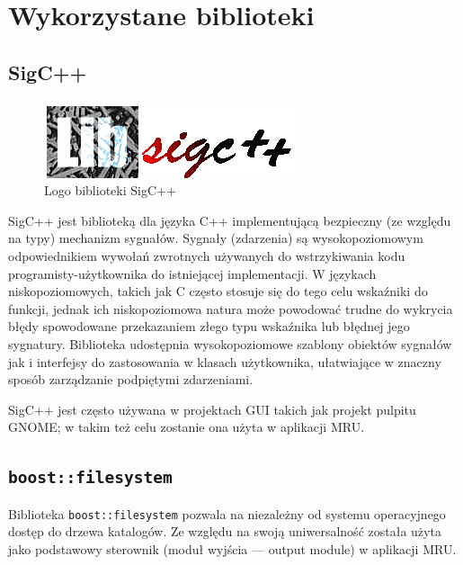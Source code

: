 
\section{Wykorzystane biblioteki}
\label{wykorzystane-biblioteki}

\subsection{SigC++}
\begin{figure}
\begin{center}
\includegraphics[scale=0.50]{img/sigcpp_logo.png}
\end{center}
\caption{Logo biblioteki SigC++}
\end{figure}
\par
SigC++ jest biblioteką dla języka C++ implementującą bezpieczny (ze względu na typy) mechanizm sygnałów.
Sygnały (zdarzenia) są wysokopoziomowym odpowiednikiem wywołań zwrotnych używanych do wstrzykiwania kodu programisty-użytkownika do istniejącej implementacji. W językach niskopoziomowych, takich jak C często stosuje się do tego celu wskaźniki do funkcji, jednak ich niskopoziomowa natura może powodować trudne do wykrycia błędy spowodowane przekazaniem złego typu wskaźnika lub błędnej jego sygnatury. Biblioteka udostępnia wysokopoziomowe szablony obiektów sygnałów jak i interfejsy do zastosowania w klasach użytkownika, ułatwiające w znaczny sposób zarządzanie podpiętymi zdarzeniami.\\
\par
SigC++ jest często używana w projektach GUI takich jak projekt pulpitu GNOME; w takim też celu zostanie ona użyta w aplikacji MRU.

\subsection{\texttt{boost::filesystem}}
\par
Biblioteka \texttt{boost::filesystem} pozwala na niezależny od systemu operacyjnego dostęp do drzewa katalogów. Ze względu na swoją uniwersalność została użyta jako podstawowy sterownik (moduł wyjścia --- output module) w aplikacji MRU.

